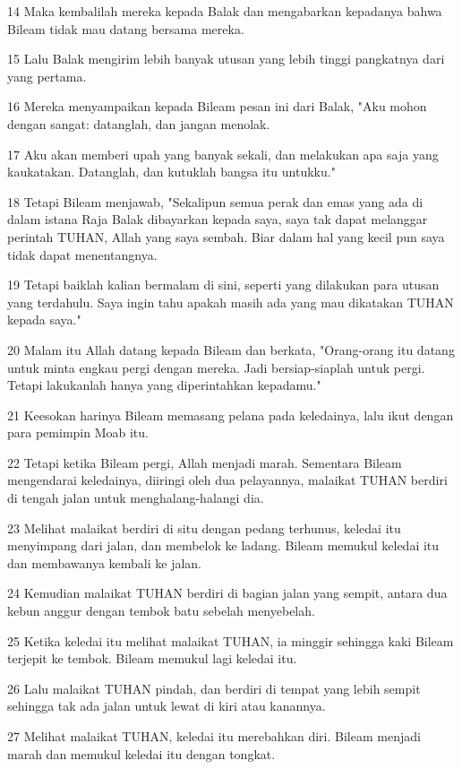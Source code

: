 \par 14 Maka kembalilah mereka kepada Balak dan mengabarkan kepadanya bahwa Bileam tidak mau datang bersama mereka.
\par 15 Lalu Balak mengirim lebih banyak utusan yang lebih tinggi pangkatnya dari yang pertama.
\par 16 Mereka menyampaikan kepada Bileam pesan ini dari Balak, "Aku mohon dengan sangat: datanglah, dan jangan menolak.
\par 17 Aku akan memberi upah yang banyak sekali, dan melakukan apa saja yang kaukatakan. Datanglah, dan kutuklah bangsa itu untukku."
\par 18 Tetapi Bileam menjawab, "Sekalipun semua perak dan emas yang ada di dalam istana Raja Balak dibayarkan kepada saya, saya tak dapat melanggar perintah TUHAN, Allah yang saya sembah. Biar dalam hal yang kecil pun saya tidak dapat menentangnya.
\par 19 Tetapi baiklah kalian bermalam di sini, seperti yang dilakukan para utusan yang terdahulu. Saya ingin tahu apakah masih ada yang mau dikatakan TUHAN kepada saya."
\par 20 Malam itu Allah datang kepada Bileam dan berkata, "Orang-orang itu datang untuk minta engkau pergi dengan mereka. Jadi bersiap-siaplah untuk pergi. Tetapi lakukanlah hanya yang diperintahkan kepadamu."
\par 21 Keesokan harinya Bileam memasang pelana pada keledainya, lalu ikut dengan para pemimpin Moab itu.
\par 22 Tetapi ketika Bileam pergi, Allah menjadi marah. Sementara Bileam mengendarai keledainya, diiringi oleh dua pelayannya, malaikat TUHAN berdiri di tengah jalan untuk menghalang-halangi dia.
\par 23 Melihat malaikat berdiri di situ dengan pedang terhunus, keledai itu menyimpang dari jalan, dan membelok ke ladang. Bileam memukul keledai itu dan membawanya kembali ke jalan.
\par 24 Kemudian malaikat TUHAN berdiri di bagian jalan yang sempit, antara dua kebun anggur dengan tembok batu sebelah menyebelah.
\par 25 Ketika keledai itu melihat malaikat TUHAN, ia minggir sehingga kaki Bileam terjepit ke tembok. Bileam memukul lagi keledai itu.
\par 26 Lalu malaikat TUHAN pindah, dan berdiri di tempat yang lebih sempit sehingga tak ada jalan untuk lewat di kiri atau kanannya.
\par 27 Melihat malaikat TUHAN, keledai itu merebahkan diri. Bileam menjadi marah dan memukul keledai itu dengan tongkat.
